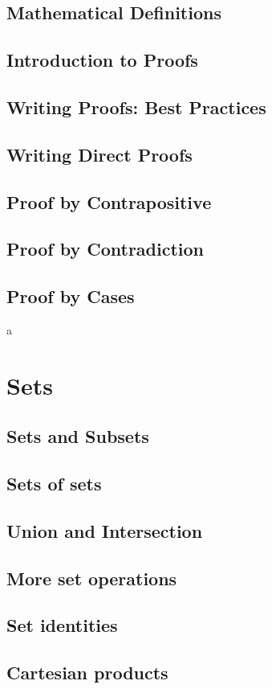 \documentclass{article}
\begin{document}
\subsection{Mathematical Definitions}
\subsection{Introduction to Proofs}
\subsection{Writing Proofs: Best Practices}
\subsection{Writing Direct Proofs}
\subsection{Proof by Contrapositive}
\subsection{Proof by Contradiction}
\subsection{Proof by Cases}

a

\section{Sets}
\subsection{Sets and Subsets}
\subsection{Sets of sets}
\subsection{Union and Intersection}
\subsection{More set operations}
\subsection{Set identities}
\subsection{Cartesian products}
\end{document}
